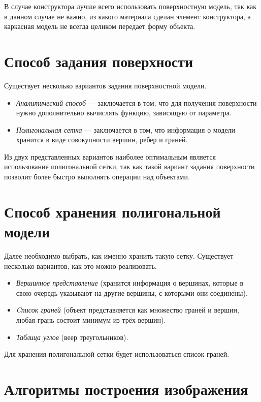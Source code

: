 В случае конструктора лучше всего использовать поверхностную модель, так как в данном случае не важно, из какого материала сделан элемент конструктора, а каркасная модель не всегда целиком передает форму объекта.

\section{Способ задания поверхности}
Существует несколько вариантов задания поверхностной модели.
\begin{itemize}[label=---]
    \item \textit{Аналитический способ} --- заключается в том, что для получения поверхности нужно дополнительно вычислять функцию, зависящую от параметра.
    \item \textit{Полигональная сетка} --- заключается в том, что информация о модели хранится в виде совокупности вершин, ребер и граней.
\end{itemize}

Из двух представленных вариантов наиболее оптимальным является использование полигональной сетки, так как такой вариант задания поверхности позволит более быстро выполнять операции над объектами.

\section{Способ хранения полигональной модели}

Далее необходимо выбрать, как именно хранить такую сетку. Существует несколько вариантов, как это можно реализовать.

\begin{itemize}[label=---]
    \item \textit{Вершинное представление} (хранится информация о вершинах, которые в свою очередь указывают на другие вершины, с которыми они соединены).
    \item \textit{Cписок граней} (объект представляется как множество граней и вершин, любая грань состоит минимум из трёх вершин).
    \item \textit{Таблица углов} (веер треугольников).
\end{itemize}

Для хранения полигональной сетки будет использоваться список граней.

\section{Алгоритмы построения изображения}

